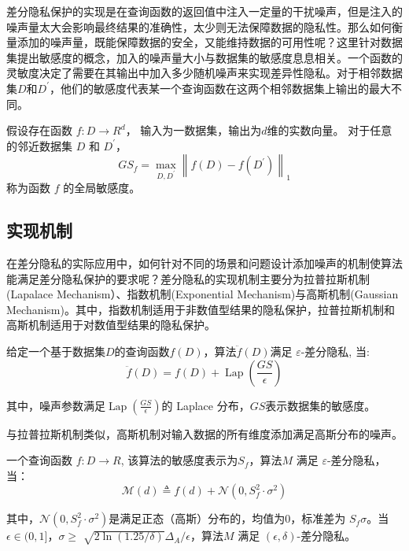 差分隐私保护的实现是在查询函数的返回值中注入一定量的干扰噪声，但是注入的噪声量太大会影响最终结果的准确性，太少则无法保障数据的隐私性。那么如何衡量添加的噪声量，既能保障数据的安全，又能维持数据的可用性呢？这里针对数据集提出敏感度的概念，加入的噪声量大小与数据集的敏感度息息相关。一个函数的灵敏度决定了需要在其输出中加入多少随机噪声来实现差异性隐私。对于相邻数据集$D$和$D^{\prime}$，他们的敏感度代表某一个查询函数在这两个相邻数据集上输出的最大不同。

\begin{define}[全局敏感度]\label{全局敏感度}
假设存在函数 $f: D \rightarrow R^{d}$， 输入为一数据集，输出为$d$维的实数向量。 对于任意的邻近数据集 $D$ 和 $D^{\prime}$，
$$
G S_{f}=\max _{D, D^{\prime}}\left\|f(D)-f\left(D^{\prime}\right)\right\|_{1}
$$
称为函数 $f$ 的全局敏感度。
\end{define}

\subsection{实现机制}
在差分隐私的实际应用中，如何针对不同的场景和问题设计添加噪声的机制使算法能满足差分隐私保护的要求呢？差分隐私的实现机制主要分为拉普拉斯机制(Lapalace Mechanism）、指数机制(Exponential Mechanism)与高斯机制(Gaussian Mechanism)。其中，指数机制适用于非数值型结果的隐私保护，拉普拉斯机制和高斯机制适用于对数值型结果的隐私保护。

\begin{theorem}[拉普拉斯机制]\label{拉普拉斯机制}
给定一个基于数据集$D$的查询函数$f(D)$，算法$\ddot{f}(D)$满足 $\varepsilon$-差分隐私, 当:
$$
\ddot{f}(D)=f(D)+\operatorname{Lap}\left(\frac{G S}{\epsilon}\right)
$$
\end{theorem}
其中，噪声参数满足$\operatorname{Lap}\left(\frac{G S}{\epsilon}\right)$的 Laplace 分布，$GS$表示数据集的敏感度。

与拉普拉斯机制类似，高斯机制对输入数据的所有维度添加满足高斯分布的噪声。
\begin{theorem}[高斯机制]\label{高斯机制}
一个查询函数 $f: D \rightarrow R$, 该算法的敏感度表示为$S_{f}$，算法$M$ 满足 $\varepsilon$-差分隐私，当：
$$
\mathcal{M}(d) \triangleq f(d)+\mathcal{N}\left(0, S_{f}^{2} \cdot \sigma^{2}\right)
$$
\end{theorem}
其中，$\mathcal{N}\left(0, S_{f}^{2} \cdot \sigma^{2}\right)$是满足正态（高斯）分布的，均值为0，标准差为 $S_{f} \sigma$。当$\epsilon \in(0,1]$，$\sigma \geq$ $\sqrt{2 \ln (1.25 / \delta)} \Delta_{A} / \epsilon$，算法$M$ 满足 $(\epsilon, \delta)$-差分隐私。

